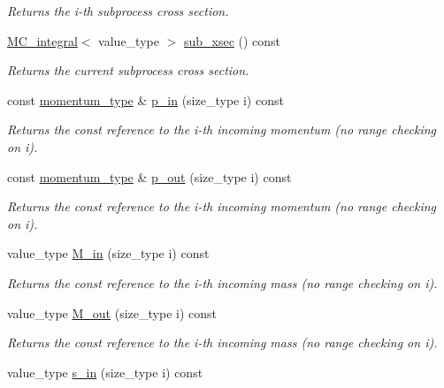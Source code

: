 \begin{DoxyCompactItemize}
\begin{DoxyCompactList}\small\item\em Returns the i-\/th subprocess cross section. \end{DoxyCompactList}\item 
\hypertarget{a00210_a11b1d4533738f78407dcddf13dee14b2}{\hyperlink{a00363}{M\-C\-\_\-integral}$<$ value\-\_\-type $>$ \hyperlink{a00210_a11b1d4533738f78407dcddf13dee14b2}{sub\-\_\-xsec} () const }\label{a00210_a11b1d4533738f78407dcddf13dee14b2}

\begin{DoxyCompactList}\small\item\em Returns the current subprocess cross section. \end{DoxyCompactList}\item 
const \hyperlink{a00559}{momentum\-\_\-type} \& \hyperlink{a00210_a4c3a6383c0445188ee515615b536f41d}{p\-\_\-in} (size\-\_\-type i) const 
\begin{DoxyCompactList}\small\item\em Returns the const reference to the i-\/th incoming momentum (no range checking on i). \end{DoxyCompactList}\item 
const \hyperlink{a00559}{momentum\-\_\-type} \& \hyperlink{a00210_affd056f9744793eef4d9cefec5d3ffb5}{p\-\_\-out} (size\-\_\-type i) const 
\begin{DoxyCompactList}\small\item\em Returns the const reference to the i-\/th incoming momentum (no range checking on i). \end{DoxyCompactList}\item 
value\-\_\-type \hyperlink{a00210_ae0e389444b66a76c7b22fd996cf16bd8}{M\-\_\-in} (size\-\_\-type i) const 
\begin{DoxyCompactList}\small\item\em Returns the const reference to the i-\/th incoming mass (no range checking on i). \end{DoxyCompactList}\item 
value\-\_\-type \hyperlink{a00210_a1aed7b697e6158749701f4fecaca42ee}{M\-\_\-out} (size\-\_\-type i) const 
\begin{DoxyCompactList}\small\item\em Returns the const reference to the i-\/th incoming mass (no range checking on i). \end{DoxyCompactList}\item 
\hypertarget{a00210_a6ae7fa6415e21a7cffc3dfc4dcbabeeb}{value\-\_\-type \hyperlink{a00210_a6ae7fa6415e21a7cffc3dfc4dcbabeeb}{s\-\_\-in} (size\-\_\-type i) const }\label{a00210_a6ae7fa6415e21a7cffc3dfc4dcbabeeb}


\end{DoxyCompactItemize}
